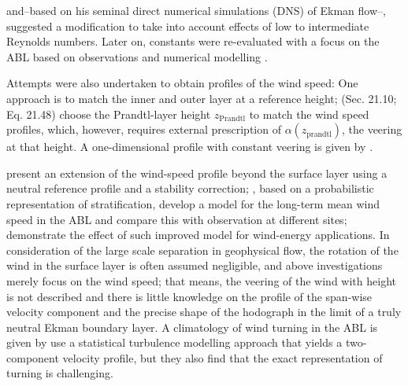 \documentclass[smallcondensed,final]{svjour3}
\begin{document}
and--based on his seminal direct numerical simulations (DNS) of Ekman flow--,~\cite{spalart:JFM1989} suggested
a modification to take into account effects of low to intermediate Reynolds numbers.
Later on, constants were re-evaluated with a focus on the ABL based on
observations \citep{hogstrom:BM1988,hogstrom:BM1996}
and numerical modelling \citep{spalart:PF2008, spalart:PF2009, ansorge:BM2014, ansorge:BM2019}.
%
\par
%
Attempts were also undertaken to obtain profiles of the wind speed: 
One approach is to match the inner and outer layer at a reference height;
\cite{etling:2002, emeis:2018}  (Sec. 21.10; Eq. 21.48) choose the Prandtl-layer height $z_\text{Prandtl}$ to match
the wind speed profiles, which, however, requires external prescription of $\alpha(z_\text{prandtl})$, the veering at that height. 
A one-dimensional profile with constant veering is given by \citet[Sec. 3; Eq. 3.1-3.19]{emeis:m2007}. 

\citet{gryning:BM2007} present an extension of the wind-speed profile beyond the surface layer
using a neutral reference profile and a stability correction;
\cite{kelly:BM2010}, based on a probabilistic representation of stratification,
develop a model for the long-term mean wind speed
in the ABL and compare this with observation at different sites; 
\cite{kelly:WE2016} demonstrate the effect of such improved model for wind-energy applications.
%
In consideration of the large scale separation in geophysical flow, the rotation of the wind in the
surface layer is often assumed negligible, and above investigations merely focus on the wind speed; 
that means, the veering of the wind with height is not described and there is little knowledge on the
profile of the span-wise velocity component and the precise shape of the hodograph in the limit of a
truly neutral Ekman boundary layer.
%
A climatology of wind turning in the ABL is given by \cite{lindvall:QJR2019} 
%
\cite{klein:PAM2021a} use a statistical turbulence modelling approach that yields a two-component velocity profile,
but they also find that the exact representation of turning is challenging.
\end{document}
